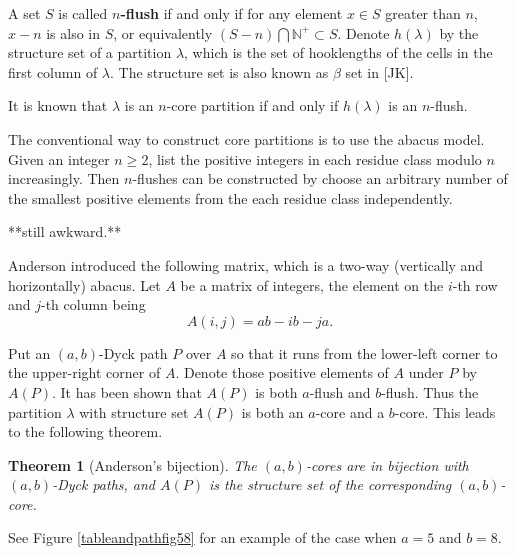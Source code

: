 \documentclass[a4paper,12pt]{article}
\newtheorem{thm}{Theorem}[section]
\begin{document}
A set $S$ is called \textbf{$n$-flush} if and only if for any element $x\in S$ greater than $n$, $x-n$ is also in $S$, or equivalently $(S-n)\bigcap \mathbb{N}^+ \subset S$. Denote $h(\lambda)$ by the structure set of a partition $\lambda$, which is the set of hooklengths of the cells in the first column of $\lambda$. The structure set is also known as $\beta$ set in [JK]. %

It is known that $\lambda$ is an $n$-core partition if and only if $h(\lambda)$ is an $n$-flush.

The conventional way to construct core partitions is to use the abacus model. Given an integer $n\geq 2$, list the positive integers in each residue class modulo $n$ increasingly.
Then $n$-flushes can be constructed by choose an arbitrary number of the smallest positive elements from the each residue class independently.



     **still  awkward.**


Anderson \cite{Anderson} introduced the following matrix, which is a two-way (vertically and horizontally) abacus. Let $A$ be a matrix of integers, the element on the $i$-th row and $j$-th column being
$$A(i,j)=ab-ib-ja.$$


Put an  $(a,b)$-Dyck path $P$ over $A$ so that it runs from the lower-left corner to the upper-right corner of $A$. Denote those positive elements of $A$ under $P$ by $A(P)$. It has been shown that $A(P)$  is both $a$-flush and $b$-flush. Thus the partition $\lambda$ with structure set $A(P)$ is both an $a$-core and a $b$-core. This leads to the following theorem.
\begin{thm} [Anderson's bijection] \label{andersonBij}
   The $(a,b)$-cores are in bijection with $(a,b)$-Dyck paths, and  $A(P)$ is the structure set of the corresponding $(a,b)$-core.
\end{thm}
See Figure \ref{tableandpathfig58} for an example of the case when $a=5$ and $b=8$.
\end{document}
